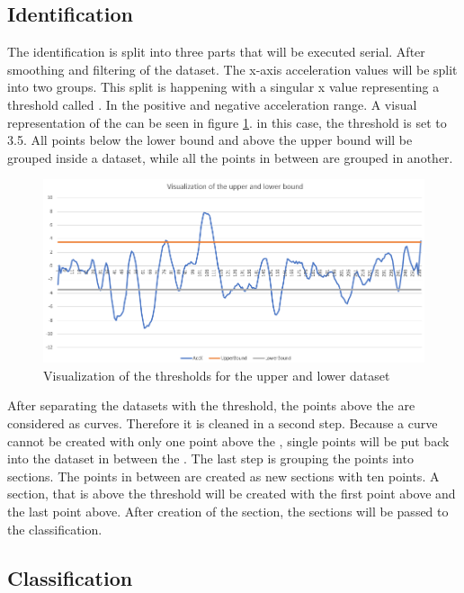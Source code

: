 \subsection{Identification}\label{identification}
The identification is split into three parts that will be executed serial. After smoothing and filtering of the dataset. The x-axis acceleration values will be split into two groups. This split is happening with a singular x value representing a threshold called . In the positive and negative acceleration range. A visual representation of the  can be seen in figure \ref{upperlowerBound}. in this case, the threshold is set to 3.5. All points below the lower bound and above the upper bound will be grouped inside a dataset, while all the points in between are grouped in another.
\begin{figure}[H]
	\centering
	\includegraphics[scale= 0.6]{Pictures/upperandlowerbound.png}
	\caption{Visualization of the thresholds for the upper and lower dataset}
	\label{upperlowerBound}
\end{figure}
After separating the datasets with the threshold, the points above the  are considered as curves. Therefore it is cleaned in a second step. Because a curve cannot be created with only one point above the , single points will be put back into the dataset in between the . The last step is grouping the points into sections. The points in between are created as new sections with ten points. A section, that is above the threshold will be created with the first point above and the last point above. After creation of the section, the sections will be passed to the classification.

\subsection{Classification}\label{classification}

